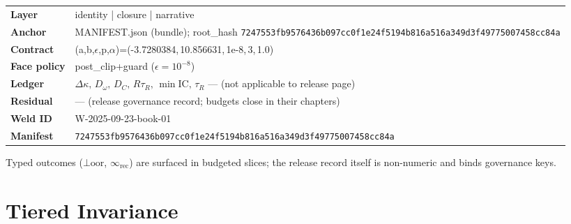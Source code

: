 \begin{eqbox}
\small

\begingroup
\def\UrlBreaks{\do\0\do\1\do\2\do\3\do\4\do\5\do\6\do\7\do\8\do\9%
  \do\a\do\b\do\c\do\d\do\e\do\f\do\A\do\B\do\C\do\D\do\E\do\F}
\def\UrlFont{\ttfamily\small}
\setlength{\tabcolsep}{6pt}

\begin{tabularx}{\linewidth}{@{}>{\bfseries}l >{\ttfamily\small\arraybackslash}X@{}}
Layer            & identity | closure | narrative \\
Anchor           & MANIFEST.json (bundle); root\_hash \nolinkurl{7247553fb9576436b097cc0f1e24f5194b816a516a349d3f49775007458cc84a} \\
Contract         & (a,b,\(\epsilon\),p,\(\alpha\))=(-3.7280384,\,10.856631,\,1e-8,\,3,\,1.0) \\
Face policy      & post\_clip+guard (\(\epsilon=10^{-8}\)) \\
Ledger           & \(\Delta\kappa,\,D_\omega,\,D_C,\,R\tau_R,\,\min\mathrm{IC},\,\tau_R\) — (not applicable to release page) \\
Residual         & — (release governance record; budgets close in their chapters) \\
Weld ID          & W-2025-09-23-book-01 \\
Manifest         & \nolinkurl{7247553fb9576436b097cc0f1e24f5194b816a516a349d3f49775007458cc84a} \\
\end{tabularx}
\endgroup

\vspace{0.2\baselineskip}
\raggedright\footnotesize
Typed outcomes (\(\bot\!\mathrm{oor}\), \(\infty_{\mathrm{rec}}\)) are surfaced in budgeted slices; the release record itself is non-numeric and binds governance keys.
\end{eqbox}



\section{Tiered Invariance}
\label{sec:tip}

